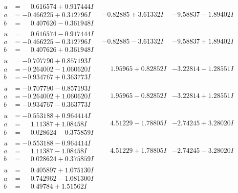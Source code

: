 \documentclass[1p]{elsarticle_modified}
\theoremstyle{definition}
\begin{document}
$$\begin{array}{c|c|c}
\begin{aligned}
u &= \phantom{-}0.616574 + 0.917444 I \\
a &= -0.466225 + 0.312796 I \\
b &= \phantom{-}0.407626 - 0.361948 I\end{aligned}
 & -0.82885 + 3.61332 I & -9.58837 - 1.89402 I \\ \hline\begin{aligned}
u &= \phantom{-}0.616574 - 0.917444 I \\
a &= -0.466225 - 0.312796 I \\
b &= \phantom{-}0.407626 + 0.361948 I\end{aligned}
 & -0.82885 - 3.61332 I & -9.58837 + 1.89402 I \\ \hline\begin{aligned}
u &= -0.707790 + 0.857193 I \\
a &= -0.264002 - 1.060620 I \\
b &= -0.934767 + 0.363773 I\end{aligned}
 & \phantom{-}1.95965 + 0.82852 I & -3.22814 - 1.28551 I \\ \hline\begin{aligned}
u &= -0.707790 - 0.857193 I \\
a &= -0.264002 + 1.060620 I \\
b &= -0.934767 - 0.363773 I\end{aligned}
 & \phantom{-}1.95965 - 0.82852 I & -3.22814 + 1.28551 I \\ \hline\begin{aligned}
u &= -0.553188 + 0.964414 I \\
a &= \phantom{-}1.11387 + 1.08458 I \\
b &= \phantom{-}0.028624 - 0.375859 I\end{aligned}
 & \phantom{-}4.51229 - 1.78805 I & -2.74245 + 3.28020 I \\ \hline\begin{aligned}
u &= -0.553188 - 0.964414 I \\
a &= \phantom{-}1.11387 - 1.08458 I \\
b &= \phantom{-}0.028624 + 0.375859 I\end{aligned}
 & \phantom{-}4.51229 + 1.78805 I & -2.74245 - 3.28020 I \\ \hline\begin{aligned}
u &= \phantom{-}0.405897 + 1.075130 I \\
a &= \phantom{-}0.742962 - 1.081300 I \\
b &= \phantom{-}0.49784 + 1.51562 I\end{aligned}

\end{array}$$
\end{document}
